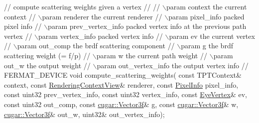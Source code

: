\begin{DoxyParagraph}{}
\begin{DoxyEnumerate}
\begin{DoxyCode}
  \textcolor{comment}{// compute scattering weights given a vertex}
  \textcolor{comment}{//}
  \textcolor{comment}{// \(\backslash\)param context               the current context}
  \textcolor{comment}{// \(\backslash\)param renderer              the current renderer}
  \textcolor{comment}{// \(\backslash\)param pixel\_info            packed pixel info}
  \textcolor{comment}{// \(\backslash\)param prev\_vertex\_info      packed vertex info at the previous path vertex}
  \textcolor{comment}{// \(\backslash\)param vertex\_info           packed vertex info}
  \textcolor{comment}{// \(\backslash\)param ev                    the current vertex}
  \textcolor{comment}{// \(\backslash\)param out\_comp              the brdf scattering component}
  \textcolor{comment}{// \(\backslash\)param g                     the brdf scattering weight (= f/p)}
  \textcolor{comment}{// \(\backslash\)param w                     the current path weight}
  \textcolor{comment}{// \(\backslash\)param out\_w                 the output weight}
  \textcolor{comment}{// \(\backslash\)param out\_vertex\_info       the output vertex info}
  \textcolor{comment}{//}
  FERMAT\_DEVICE
  \textcolor{keywordtype}{void} compute\_scattering\_weights(
      \textcolor{keyword}{const} TPTContext&           context,
      \textcolor{keyword}{const} \hyperlink{struct_rendering_context_view}{RenderingContextView}& renderer,
      \textcolor{keyword}{const} \hyperlink{union_pixel_info}{PixelInfo}             pixel\_info,
      \textcolor{keyword}{const} uint32                prev\_vertex\_info,
      \textcolor{keyword}{const} uint32                vertex\_info,
      \textcolor{keyword}{const} \hyperlink{struct_eye_vertex}{EyeVertex}&            ev,
      \textcolor{keyword}{const} uint32                out\_comp,
      \textcolor{keyword}{const} \hyperlink{structcugar_1_1_vector}{cugar::Vector3f}&      g,
      \textcolor{keyword}{const} \hyperlink{structcugar_1_1_vector}{cugar::Vector3f}&      w,
            \hyperlink{structcugar_1_1_vector}{cugar::Vector3f}&      out\_w,
            uint32&               out\_vertex\_info);


\end{DoxyCode}
\end{DoxyEnumerate}
\end{DoxyParagraph}
